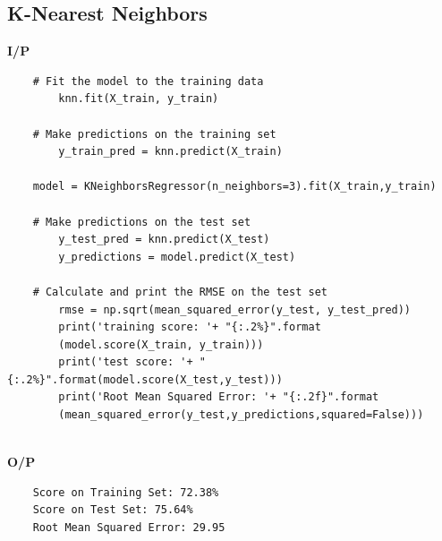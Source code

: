 \subsection{K-Nearest Neighbors}
\noindent
\textbf{I/P} \\[-1.5em] 
\begin{verbatim}
    # Fit the model to the training data
        knn.fit(X_train, y_train)

    # Make predictions on the training set
        y_train_pred = knn.predict(X_train)

    model = KNeighborsRegressor(n_neighbors=3).fit(X_train,y_train) 
    
    # Make predictions on the test set
        y_test_pred = knn.predict(X_test)
        y_predictions = model.predict(X_test)

    # Calculate and print the RMSE on the test set
        rmse = np.sqrt(mean_squared_error(y_test, y_test_pred))
        print('training score: '+ "{:.2%}".format
        (model.score(X_train, y_train))) 
        print('test score: '+ "{:.2%}".format(model.score(X_test,y_test))) 
        print('Root Mean Squared Error: '+ "{:.2f}".format
        (mean_squared_error(y_test,y_predictions,squared=False))) 
\end{verbatim}
\\
\noindent
\textbf{O/P} \\[-1.5em]
\begin{verbatim}
    Score on Training Set: 72.38% 
    Score on Test Set: 75.64% 
    Root Mean Squared Error: 29.95 
\end{verbatim}

